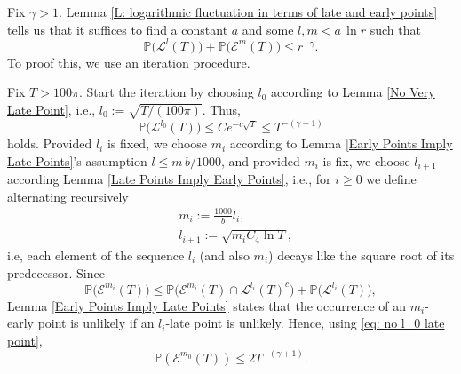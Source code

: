 \documentclass[11pt]{article}
\makeatletter
\renewenvironment{proof}[1][\proofname]{
   \par\pushQED{\qed}\normalfont
   \topsep6\p@\@plus6\p@\relax
   \trivlist\item[\hskip\labelsep\bfseries#1\@addpunct{.}]
   \ignorespaces
}{
   \popQED\endtrivlist\@endpefalse
}
\numberwithin{equation}{section}
\makeatother
\begin{document}
\begin{proof}[Proof of Theorem \ref{log fluctuation}]
  \renewcommand{\qedsymbol}{}
  Fix $\gamma > 1$.  
  Lemma \ref{L: logarithmic fluctuation in terms of late and early points} tells us that
  it suffices to find a constant $a$ and some $l, m < a \,\ln r$ such that 
  \begin{equation}\label{eq: lemma rephares log fluc in terms of early and late points}
    \mathbb{P} \big( \mathcal{L}^l(T)\big) 
    +\mathbb{P} \big( \mathcal{E}^m(T)\big)
    \leq r^{-\gamma}.
  \end{equation}
  To proof this, we use an iteration procedure.

  Fix $T > 100  \pi$.
  Start the iteration by choosing $l_0$ according to 
  Lemma \ref{No Very Late Point}, i.e.,
  $l_0 := \sqrt{T/(100 \pi)}$. Thus, 
  \begin{equation}\label{eq: no l_0 late point}
    \mathbb{P} \big( \mathcal{L}^{l_0}(T) \big) \leq C e^{-c \sqrt{T}}
    \leq T^{-(\gamma + 1)} 
  \end{equation}
  holds. Provided $l_i$ is fixed, we choose $m_i$ 
  according to Lemma \ref{Early Points Imply Late Points}'s 
  assumption $l \leq m\, b/1000$, 
  and provided $m_i$ is fix, we choose $l_{i+1}$ according Lemma \ref{Late Points Imply Early Points}, 
  i.e., for $i \geq 0$ we define alternating recursively 
  \begin{equation} \label{eq: def of l_i, m_i}
    \begin{split}
      & m_i :=  \frac{1000}{b} l_i,\\
      & l_{i+1} := \sqrt{ m_i C_4 \ln T },
    \end{split} 
  \end{equation}
  i.e, each element of the sequence 
  $l_{i}$ (and also $m_{i}$) decays like the square root 
  of its predecessor.
  Since
  \begin{equation}\nonumber
    \mathbb{P} \big( \mathcal{E}^{m_i}(T) \big) 
    \leq 
    \mathbb{P} \big( \mathcal{E}^{m_i} (T) \cap 
    \mathcal{L}^{l_i}(T)^c \big) + 
    \mathbb{P} \big(\mathcal{L}^{l_i}(T) \big),
  \end{equation}
  Lemma \ref{Early Points Imply Late Points} states that the occurrence of 
  an $m_i$-early point is unlikely if an $l_i$-late point is unlikely. 
  Hence, using \eqref{eq: no l_0 late point}, 
  \begin{equation}\label{eq: first step m_0}
    \mathbb{P}(\mathcal{E}^{m_0}(T)) 
    \leq 2T^{-(\gamma +1)}.  
  \end{equation}

\end{proof}
\end{document}
